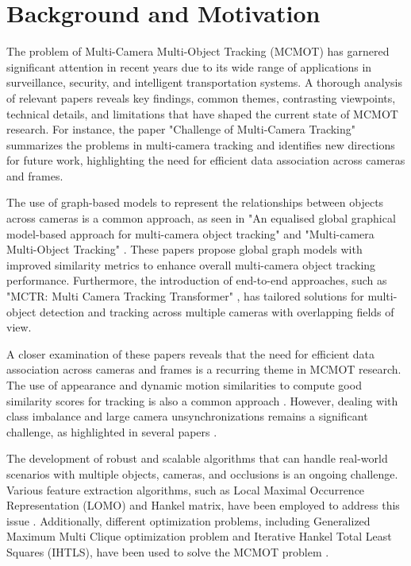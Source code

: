 \documentclass[conference]{IEEEtran}
\begin{document}
\section{Background and Motivation}
The problem of Multi-Camera Multi-Object Tracking (MCMOT) has garnered significant attention in recent years due to its wide range of applications in surveillance, security, and intelligent transportation systems. A thorough analysis of relevant papers reveals key findings, common themes, contrasting viewpoints, technical details, and limitations that have shaped the current state of MCMOT research. For instance, the paper "Challenge of Multi-Camera Tracking" \cite{Challenge of Multi-Camera Tracking} summarizes the problems in multi-camera tracking and identifies new directions for future work, highlighting the need for efficient data association across cameras and frames.

The use of graph-based models to represent the relationships between objects across cameras is a common approach, as seen in "An equalised global graphical model-based approach for multi-camera object tracking" \cite{An equalised global graphical model-based approach for multi-camera object tracking} and "Multi-camera Multi-Object Tracking" \cite{Multi-camera Multi-Object Tracking}. These papers propose global graph models with improved similarity metrics to enhance overall multi-camera object tracking performance. Furthermore, the introduction of end-to-end approaches, such as "MCTR: Multi Camera Tracking Transformer" \cite{MCTR: Multi Camera Tracking Transformer}, has tailored solutions for multi-object detection and tracking across multiple cameras with overlapping fields of view.

A closer examination of these papers reveals that the need for efficient data association across cameras and frames is a recurring theme in MCMOT research. The use of appearance and dynamic motion similarities to compute good similarity scores for tracking is also a common approach \cite{Graph Convolutional Network for Multi-Target Multi-Camera Vehicle Tracking}. However, dealing with class imbalance and large camera unsynchronizations remains a significant challenge, as highlighted in several papers \cite{Challenge of Multi-Camera Tracking, An equalised global graphical model-based approach for multi-camera object tracking}.

The development of robust and scalable algorithms that can handle real-world scenarios with multiple objects, cameras, and occlusions is an ongoing challenge. Various feature extraction algorithms, such as Local Maximal Occurrence Representation (LOMO) and Hankel matrix, have been employed to address this issue \cite{Multi-camera Multi-Object Tracking}. Additionally, different optimization problems, including Generalized Maximum Multi Clique optimization problem and Iterative Hankel Total Least Squares (IHTLS), have been used to solve the MCMOT problem \cite{An equalised global graphical model-based approach for multi-camera object tracking, Graph Convolutional Network for Multi-Target Multi-Camera Vehicle Tracking}.
\end{document}
